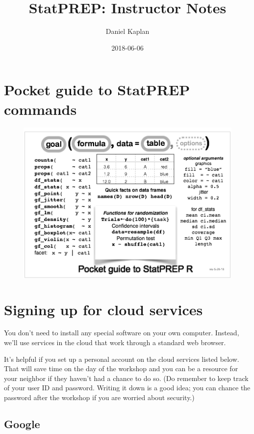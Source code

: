 \documentclass[]{book}
\title{StatPREP: Instructor Notes}
\author{Daniel Kaplan}
\date{2018-06-06}
\theoremstyle{definition}
\theoremstyle{definition}
\theoremstyle{definition}
\theoremstyle{remark}
\begin{document}
\maketitle

{
\setcounter{tocdepth}{1}
\tableofcontents
}
\chapter{Pocket guide to StatPREP
commands}\label{pocket-guide-to-statprep-commands}

\begin{figure}
\centering
\includegraphics{images/essential_statprep_commands.png}
\caption{}
\end{figure}

\chapter{Signing up for cloud
services}\label{signing-up-for-cloud-services}

You don't need to install any special software on your own computer.
Instead, we'll use services in the cloud that work through a standard
web browser.

It's helpful if you set up a personal account on the cloud services
listed below. That will save time on the day of the workshop and you can
be a resource for your neighbor if they haven't had a chance to do so.
(Do remember to keep track of your user ID and password. Writing it down
is a good idea; you can chance the password after the workshop if you
are worried about security.)

\section{Google}\label{google}
\end{document}
